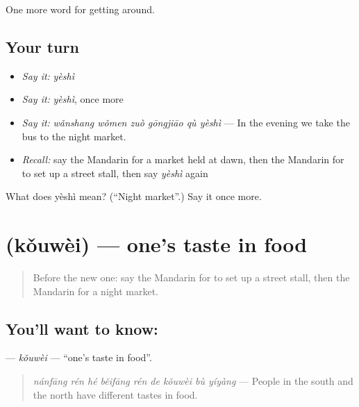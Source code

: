 \begin{grammarlens}[title={What you've built}]
One more word for getting around.
\end{grammarlens}

\subsection*{Your turn}
\begin{itemize}
\raggedright
  \item \emph{Say it:} \emph{yèshì}
  \item \emph{Say it:} \emph{yèshì}, once more
  \item \emph{Say it:} \emph{wǎnshang wǒmen zuò gōngjiāo qù yèshì} — In the evening we take the bus to the night market.
  \item \emph{Recall:} say the Mandarin for a market held at dawn, then the Mandarin for to set up a street stall, then say \emph{yèshì} again
\end{itemize}

\begin{tcolorbox}[breakable,colback=teal!4,colframe=teal!35!black,title={Before you move on}]
What does yèshì mean? (\textquotedblleft{}Night market\textquotedblright{}.) Say it once more.
\end{tcolorbox}
\section[\texorpdfstring{\zh{口味} (kǒuwèi)}{口味 (kǒuwèi)}]{ (kǒuwèi) — one's taste in food}

\label{lesson:ZH-C449-kouwei}



\begin{quote}
Before the new one: say the Mandarin for to set up a street stall, then the Mandarin for a night market.
\end{quote}

\subsection*{You'll want to know: }
\textbf{} — \emph{kǒuwèi} — \textquotedblleft{}one's taste in food\textquotedblright{}.

\begin{quote}
\emph{nánfāng rén hé běifāng rén de kǒuwèi bù yíyàng} — People in the south and the north have different tastes in food.
\end{quote}

